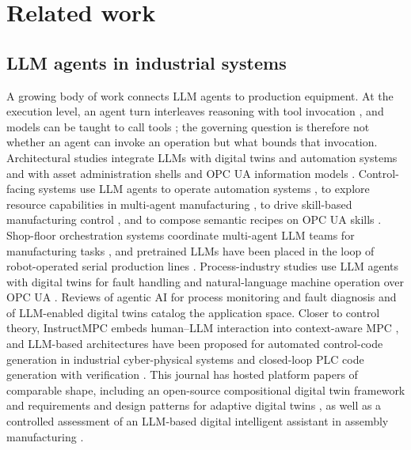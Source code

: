 \section{Related work}
\label{sec:related}

\subsection{LLM agents in industrial systems}
\label{sec:related-agents}

A growing body of work connects LLM agents to production equipment. At the
execution level, an agent turn interleaves reasoning with tool invocation
\cite{yao2023react}, and models can be taught to call tools
\cite{schick2023toolformer}; the governing question is therefore not
whether an agent can invoke an operation but what bounds that invocation.
Architectural studies integrate LLMs with digital twins and automation
systems \cite{xia2025architecture} and with asset administration shells and
OPC UA information models \cite{graul2026aas}. Control-facing systems use
LLM agents to operate automation systems \cite{xia2025control}, to explore
resource capabilities in multi-agent manufacturing
\cite{lim2025llmenabled}, to drive skill-based manufacturing control
\cite{koehle2026llmdriven}, and to compose semantic recipes on OPC UA
skills \cite{koehle2025semanticrecipes}. Shop-floor orchestration systems
coordinate multi-agent LLM teams for manufacturing tasks
\cite{zhao2026shopfloor}, and pretrained LLMs have been placed in the loop
of robot-operated serial production lines \cite{waseem2026pretrained}.
Process-industry studies use LLM agents with digital twins for fault
handling \cite{gill2025llmdt} and natural-language machine operation over
OPC UA \cite{hofmann2025nlc}. Reviews of agentic AI for process monitoring
and fault diagnosis \cite{jiang2026agentic} and of LLM-enabled digital
twins \cite{gill2025llmdt} catalog the application space. Closer to control
theory, InstructMPC embeds human--LLM interaction into context-aware MPC
\cite{wu2025instructmpc}, and LLM-based architectures have been proposed
for automated control-code generation in industrial cyber-physical systems
\cite{huang2026made} and closed-loop PLC code generation with verification
\cite{liu2026agents4plc}. This journal has hosted platform papers of
comparable shape, including an open-source compositional digital twin
framework \cite{opentwins2023} and requirements and design patterns for
adaptive digital twins \cite{dtpatterns2023}, as well as a controlled
assessment of an LLM-based digital intelligent assistant in assembly
manufacturing \cite{llmdia2024}.

